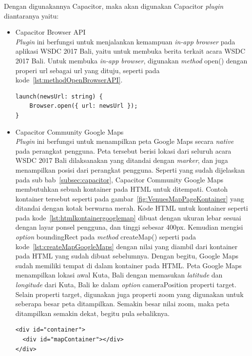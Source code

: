 Dengan digunakannya Capacitor, maka akan digunakan Capacitor \textit{plugin} diantaranya yaitu:

\begin{itemize}
	\item Capacitor Browser API \\	
	\textit{Plugin} ini berfungsi untuk menjalankan kemampuan \textit{in-app browser} pada aplikasi WSDC 2017 Bali, yaitu untuk membuka berita terkait acara WSDC 2017 Bali. Untuk membuka \textit{in-app browser}, digunakan \textit{method} open() dengan properi url sebagai url yang dituju, seperti pada kode~\ref{lst:methodOpenBrowserAPI}.
	\newpage
\begin{lstlisting}[label={lst:methodOpenBrowserAPI}, caption=\textit{Method} open() Pada Browser API]
launch(newsUrl: string) {
	Browser.open({ url: newsUrl });
}
\end{lstlisting}
	
	\item Capacitor Community Google Maps \\
	\textit{Plugin} ini berfungsi untuk menampilkan peta Google Maps secara \textit{native} pada perangkat pengguna. Peta tersebut berisi lokasi dari seluruh acara WSDC 2017 Bali dilaksanakan yang ditandai dengan \textit{marker}, dan juga menampilkan posisi dari perangkat pengguna. Seperti yang sudah dijelaskan pada sub bab~\ref{subsec:capacitor}, Capacitor Community Google Maps membutuhkan sebuah kontainer pada HTML untuk ditempati. Contoh kontainer tersebut seperti pada gambar~\ref{fig:VenuesMapPageKontainer} yang ditandai dengan kotak berwarna merah. Kode HTML untuk kontainer seperti pada kode~\ref{lst:htmlkontainergooglemap} dibuat dengan ukuran lebar sesuai dengan layar ponsel pengguna, dan tinggi sebesar 400px. Kemudian mengisi \textit{option} boundingRect pada \textit{method} createMap() seperti pada kode~\ref{lst:createMapGoogleMaps} dengan nilai yang diambil dari kontainer pada HTML yang sudah dibuat sebelumnya. Dengan begitu, Google Maps sudah memiliki tempat di dalam kontainer pada HTML. Peta Google Maps menampilkan lokasi awal Kuta, Bali dengan memasukan \textit{latitude} dan \textit{longitude} dari Kuta, Bali ke dalam \textit{option} cameraPosition properti target. Selain properti target, digunakan juga properti zoom yang digunakan untuk seberapa besar peta ditampilkan. Semakin besar nilai zoom, maka peta ditampilkan semakin dekat, begitu pula sebaliknya.
	
\begin{lstlisting}[label={lst:htmlkontainergooglemap}, caption=Kontainer pada HTML untuk Peta Capacitor CommunityGoogle Maps]
<div id="container">
  <div id="mapContainer"></div>
</div>
\end{lstlisting}


\end{itemize}
